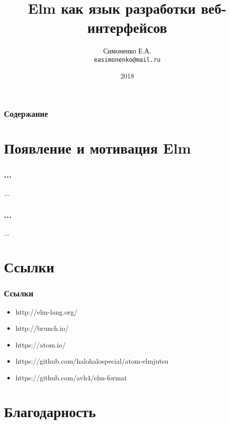 \documentclass[11pt]{beamer}
\begin{document}
\author{Симоненко Е.А. \\ \texttt{easimonenko@mail.ru}}
\title{Elm как язык разработки веб-интерфейсов}
\date{2018}

\begin{frame}
\titlepage
\end{frame}

\begin{frame}
\frametitle{Содержание}
\tableofcontents
\end{frame}

\section{Появление и мотивация Elm}

\begin{frame}
\frametitle{...}
...
\end{frame}

\begin{frame}
\frametitle{...}
...
\end{frame}

\section{Ссылки}

\begin{frame}
\frametitle{Ссылки}
\begin{itemize}
\item http://elm-lang.org/
\item http://brunch.io/
\item https://atom.io/
\item https://github.com/halohalospecial/atom-elmjutsu
\item https://github.com/avh4/elm-format
\end{itemize}
\end{frame}

\section*{Благодарность}

\end{document}
